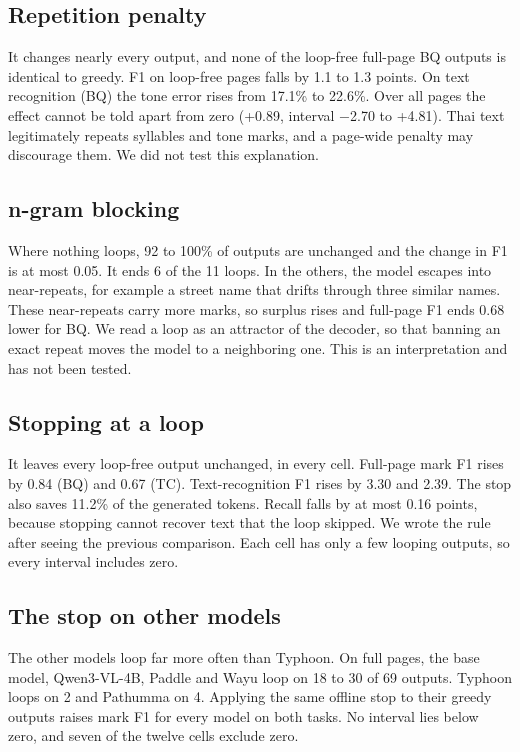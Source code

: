 \subsection{Repetition penalty}
It changes nearly every output, and none of the loop-free full-page BQ outputs is identical to greedy. F1 on loop-free pages falls by 1.1 to 1.3 points. On text recognition (BQ) the tone error rises from 17.1\% to 22.6\%. Over all pages the effect cannot be told apart from zero (+0.89, interval $-$2.70 to +4.81). Thai text legitimately repeats syllables and tone marks, and a page-wide penalty may discourage them. We did not test this explanation.

\subsection{n-gram blocking}
Where nothing loops, 92 to 100\% of outputs are unchanged and the change in F1 is at most 0.05. It ends 6 of the 11 loops. In the others, the model escapes into near-repeats, for example a street name that drifts through three similar names. These near-repeats carry more marks, so surplus rises and full-page F1 ends 0.68 lower for BQ. We read a loop as an attractor of the decoder, so that banning an exact repeat moves the model to a neighboring one. This is an interpretation and has not been tested.

\subsection{Stopping at a loop}
It leaves every loop-free output unchanged, in every cell. Full-page mark F1 rises by 0.84 (BQ) and 0.67 (TC). Text-recognition F1 rises by 3.30 and 2.39. The stop also saves 11.2\% of the generated tokens. Recall falls by at most 0.16 points, because stopping cannot recover text that the loop skipped. We wrote the rule after seeing the previous comparison. Each cell has only a few looping outputs, so every interval includes zero.

\subsection{The stop on other models}
The other models loop far more often than Typhoon. On full pages, the base model, Qwen3-VL-4B, Paddle and Wayu loop on 18 to 30 of 69 outputs. Typhoon loops on 2 and Pathumma on 4. Applying the same offline stop to their greedy outputs raises mark F1 for every model on both tasks. No interval lies below zero, and seven of the twelve cells exclude zero.


